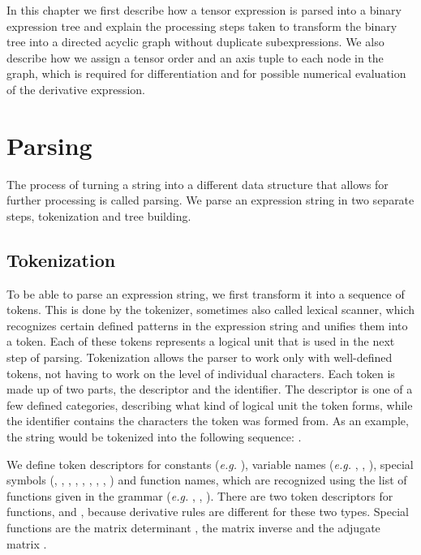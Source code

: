 \documentclass[12pt, a4paper]{report}
\begin{document}
In this chapter we first describe how a tensor expression is parsed into a binary expression tree and explain the processing steps taken to transform the binary tree into a directed acyclic graph without duplicate subexpressions.
We also describe how we assign a tensor order and an axis tuple to each node in the graph, which is required for differentiation and for possible numerical evaluation of the derivative expression.

\section{Parsing}
The process of turning a string into a different data structure that allows for further processing is called parsing.
We parse an expression string in two separate steps, tokenization and tree building.

\subsection{Tokenization}
To be able to parse an expression string, we first transform it into a sequence of tokens.
This is done by the tokenizer, sometimes also called lexical scanner, which recognizes certain defined patterns in the expression string and unifies them into a token.
Each of these tokens represents a logical unit that is used in the next step of parsing.
Tokenization allows the parser to work only with well-defined tokens, not having to work on the level of individual characters.
Each token is made up of two parts, the descriptor and the identifier.
The descriptor is one of a few defined categories, describing what kind of logical unit the token forms, while the identifier contains the characters the token was formed from.
As an example, the string  would be tokenized into the following sequence: .

We define token descriptors for constants (\textit{e.g.} ), variable names (\textit{e.g.} , , ), special symbols (, , , , , , , , ) and function names, which are recognized using the list of functions given in the grammar (\textit{e.g.}  , , ).
There are two token descriptors for functions,  and , because derivative rules are different for these two types.
Special functions are the matrix determinant , the matrix inverse  and the adjugate matrix .
\end{document}

